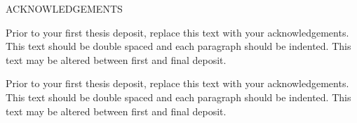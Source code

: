 \begin{doublespace}
\begin{tightcenter}
ACKNOWLEDGEMENTS
\mylinespacing
\end{tightcenter}

Prior to your first thesis deposit, replace this text with your acknowledgements.  This text should be double spaced and each paragraph should be indented.  This text may be altered between first and final deposit.

Prior to your first thesis deposit, replace this text with your acknowledgements.  This text should be double spaced and each paragraph should be indented.  This text may be altered between first and final deposit.  
\mylinespacing
\begin{tightcenter}
\myoptpg
\end{tightcenter}
\end{doublespace}
